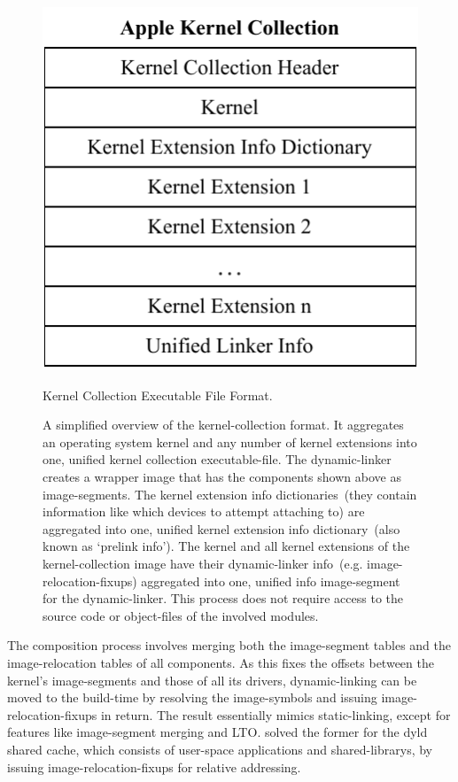 \begin{figure}[htb]
  \centering
  \includegraphics{Figures/AppleKC.pdf}
  \caption{Kernel Collection Executable File Format.}
  \label{fig:apple_kc}
  \caption*{A simplified overview of the  \gls{kernel-collection} format. It aggregates an operating system kernel and any number of kernel extensions into one, unified kernel collection \gls{executable-file}. The \gls{dynamic-linker} creates a wrapper  \gls{image} that has the components shown above as \glspl{image-segment}. The kernel extension info dictionaries~(they contain information like which devices to attempt attaching to) are aggregated into one, unified kernel extension info dictionary~(also known as `prelink info'). The kernel and all kernel extensions of the \gls{kernel-collection} \gls{image} have their \gls{dynamic-linker} info~(e.g. \glspl{image-relocation-fixup}) aggregated into one, unified info \gls{image-segment} for the \gls{dynamic-linker}. This process does not require access to the source code or \glspl{object-file} of the involved modules.}
\end{figure}

The composition process involves merging both the \gls{image-segment} tables and the \gls{image-relocation} tables of all components. As this fixes the offsets between the kernel's \glspl{image-segment} and those of all its drivers, \gls{dynamic-linking} can be moved to the build-time by resolving the \glspl{image-symbol} and issuing \glspl{image-relocation-fixup} in return. The result essentially mimics \gls{static-linking}, except for features like \gls{image-segment} merging and \gls{LTO}.  solved the former for the dyld shared cache, which consists of \gls{user-space} applications and \glspl{shared-library}, by issuing \glspl{image-relocation-fixup} for relative addressing.

